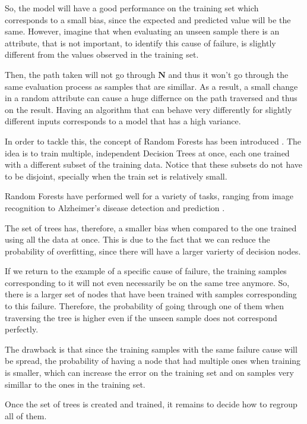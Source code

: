 So, the model will have a good performance on the training set which corresponds to a small bias, since the expected and predicted value will be the same.
However, imagine that when evaluating an unseen sample there is an attribute, that is not important, to identify this cause of failure, is slightly different from the values observed in the training set.

Then, the path taken will not go through $\mathbf{N}$ and thus it won't go through the same evaluation process as samples that are simillar.
As a result, a small change in a random attribute can cause a huge differnce on the path traversed and thus on the result.
Having an algorithm that can behave very differently for slightly different inputs corresponds to a model that has a high variance.

In order to tackle this, the concept of Random Forests has been introduced \cite{ho1995random}.
The idea is to train multiple, independent Decision Trees at once, each one trained with a different subset of the training data.
Notice that these subsets do not have to be disjoint, specially when the train set is relatively small.

Random Forests have performed well for a variety of tasks, ranging from image recognition to Alzheimer's disease detection and prediction \cite{shaik2019brief}.

The set of trees has, therefore, a smaller bias when compared to the one trained using all the data at once.
This is due to the fact that we can reduce the probability of overfitting, since there will have a larger varierty of decision nodes.

If we return to the example of a specific cause of failure, the training samples corresponding to it will not even necessarily be on the same tree anymore.
So, there is a larger set of nodes that have been trained with samples corresponding to this failure.
Therefore, the probability of going through one of them when traversing the tree is higher even if the unseen sample does not correspond perfectly.

The drawback is that since the training samples with the same failure cause will be spread, the probability of having a node that had multiple ones when training is smaller, which can increase the error on the training set and on samples very simillar to the ones in the training set.

Once the set of trees is created and trained, it remains to decide how to regroup all of them.

